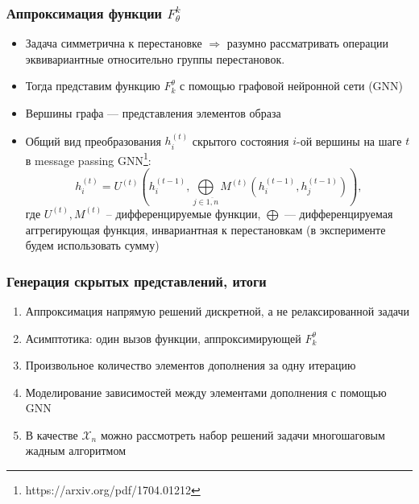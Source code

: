 \documentclass[10pt]{beamer}
\begin{document}
\begin{frame}
	\frametitle{Аппроксимация функции $F_\theta^k$}
		\begin{itemize}
			\item  Задача симметрична к перестановке $\Longrightarrow$ разумно рассматривать операции эквивариантные относительно группы перестановок.
			\item Тогда представим функцию $F_k^\theta$ с помощью графовой нейронной сети (GNN)
			\item Вершины графа --- представления элементов образа
			\item Общий вид преобразования $h_i^{(t)}$ скрытого состояния $i$-ой вершины на шаге $t$ в message passing GNN\footnote{https://arxiv.org/pdf/1704.01212}:
			$$h_i^{(t)} = U^{(t)} \left(h_i^{(t-1)}, \bigoplus\limits_{j\in \overline{1, n}}M^{(t)} \left(h_i^{(t-1)}, h_j^{(t-1)} \right) \right),$$
			где $U^{(t)}, M^{(t)}$ -- дифференцируемые функции, $\bigoplus$ --- дифференцируемая аггрегирующая функция, инвариантная к перестановкам (в эксперименте будем использовать сумму)
		\end{itemize}
\end{frame}

\begin{frame}
	\frametitle{Генерация скрытых представлений, итоги}
		\begin{enumerate}
			\item Аппроксимация напрямую решений дискретной, а не релаксированной задачи
			\item Асимптотика: один вызов функции, аппроксимирующей $F_k^\theta$
			\item Произвольное количество элементов дополнения за одну итерацию
			\item Моделирование зависимостей между элементами дополнения с помощью GNN
			\item В качестве $\mathcal{X}_n$ можно рассмотреть набор решений задачи многошаговым жадным алгоритмом
		\end{enumerate}
\end{frame}
\end{document}
